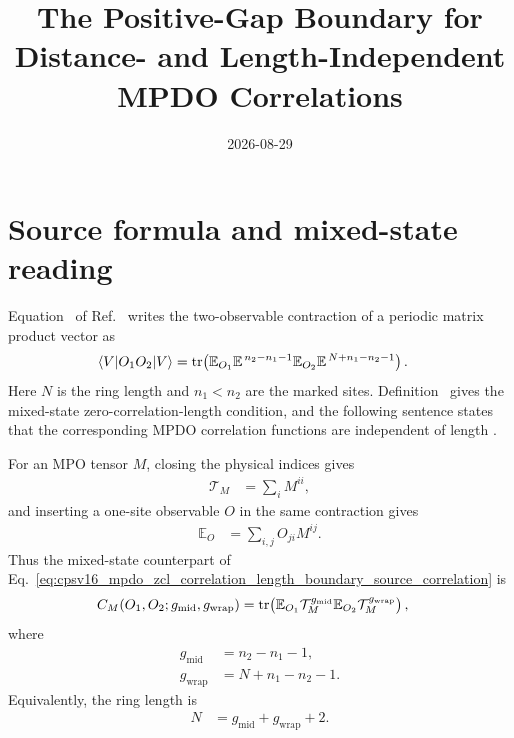 \documentclass{article}
\title{The Positive-Gap Boundary for Distance- and Length-Independent MPDO
Correlations}
\author{}
\date{2026-08-29}
\begin{document}
\maketitle
{}

\section{Source formula and mixed-state reading}

Equation~ of
Ref.~\cite{Cirac2016MPDO_arXiv} writes the two-observable contraction of a
periodic matrix product vector as
\begin{align}
    \langle V|O_1O_2|V\rangle
        &=\operatorname{tr}\!\left(
          \mathbb E_{O_1}\mathbb E^{\,n_2-n_1-1}
          \mathbb E_{O_2}\mathbb E^{\,N+n_1-n_2-1}\right).
    \label{eq:cpsv16_mpdo_zcl_correlation_length_boundary_source_correlation}
\end{align}
Here $N$ is the ring length and $n_1<n_2$ are the marked sites.
Definition~ gives the mixed-state zero-correlation-length
condition, and the following sentence states that the corresponding MPDO
correlation functions are independent of length
\cite[lines~735--742]{Cirac2016MPDO_arXiv}.

For an MPO tensor $M$, closing the physical indices gives
\begin{align}
    \mathcal T_M
        &=\sum_i M^{ii},
    \label{eq:cpsv16_mpdo_zcl_correlation_length_boundary_physical_trace_transfer}
\end{align}
and inserting a one-site observable $O$ in the same contraction gives
\begin{align}
    \mathbb E_O
        &=\sum_{i,j}O_{ji}M^{ij}.
    \label{eq:cpsv16_mpdo_zcl_correlation_length_boundary_observable_insertion}
\end{align}
Thus the mixed-state counterpart of
Eq.~\ref{eq:cpsv16_mpdo_zcl_correlation_length_boundary_source_correlation}
is
\begin{align}
    C_M(O_1,O_2;g_{\mathrm{mid}},g_{\mathrm{wrap}})
        &=\operatorname{tr}\!\left(
          \mathbb E_{O_1}\mathcal T_M^{g_{\mathrm{mid}}}
          \mathbb E_{O_2}\mathcal T_M^{g_{\mathrm{wrap}}}\right),
    \label{eq:cpsv16_mpdo_zcl_correlation_length_boundary_mixed_correlation}
\end{align}
where
\begin{align}
    g_{\mathrm{mid}}
        &=n_2-n_1-1,
    \label{eq:cpsv16_mpdo_zcl_correlation_length_boundary_middle_gap}\\
    g_{\mathrm{wrap}}
        &=N+n_1-n_2-1.
    \label{eq:cpsv16_mpdo_zcl_correlation_length_boundary_wrapping_gap}
\end{align}
Equivalently, the ring length is
\begin{align}
    N
        &=g_{\mathrm{mid}}+g_{\mathrm{wrap}}+2.
    \label{eq:cpsv16_mpdo_zcl_correlation_length_boundary_ring_length}
\end{align}
\end{document}
